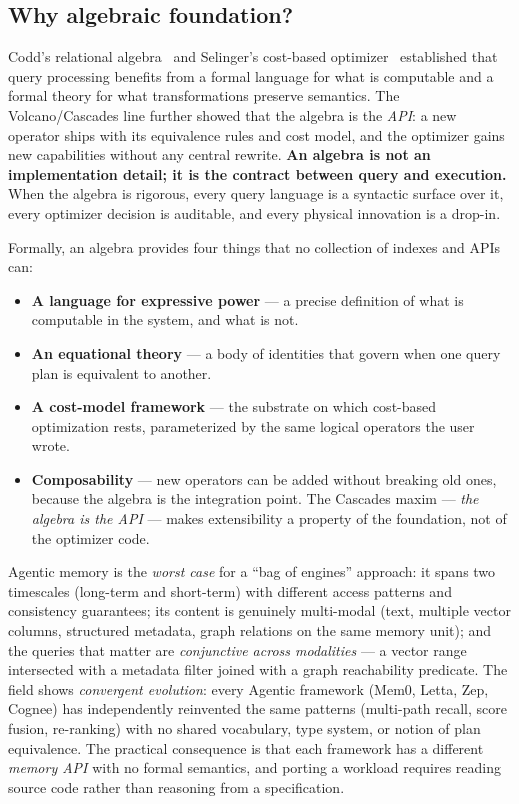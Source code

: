 \documentclass[acmsmall,review,anonymous]{acmart}
\theoremstyle{plain}
\theoremstyle{definition}
\theoremstyle{remark}
\begin{document}
\subsection{Why algebraic foundation?}\label{sec:intro:algebra}

Codd's relational algebra~\cite{codd1970} and Selinger's
cost-based optimizer~\cite{selinger1979} established that query
processing benefits from a formal language for what is computable
and a formal theory for what transformations preserve semantics.
The Volcano/Cascades line further showed that the algebra is the
\emph{API}: a new operator ships with its equivalence rules and cost
model, and the optimizer gains new capabilities without any central
rewrite. \textbf{An algebra is not an implementation detail; it is
the contract between query and execution.} When the algebra is
rigorous, every query language is a syntactic surface over it, every
optimizer decision is auditable, and every physical innovation is a
drop-in.

Formally, an algebra provides four things that no collection of
indexes and APIs can:

\begin{itemize}[leftmargin=*]
  \item \textbf{A language for expressive power} --- a precise
    definition of what is computable in the system, and what is not.
  \item \textbf{An equational theory} --- a body of identities that
    govern when one query plan is equivalent to another.
  \item \textbf{A cost-model framework} --- the substrate on which
    cost-based optimization rests, parameterized by the same logical
    operators the user wrote.
  \item \textbf{Composability} --- new operators can be added without
    breaking old ones, because the algebra is the integration point.
    The Cascades maxim --- \emph{the algebra is the API} --- makes
    extensibility a property of the foundation, not of the optimizer
    code.
\end{itemize}

Agentic memory is the \emph{worst case} for a ``bag of engines''
approach: it spans two timescales (long-term and short-term) with
different access patterns and consistency guarantees; its content
is genuinely multi-modal (text, multiple vector columns, structured
metadata, graph relations on the same memory unit); and the queries
that matter are \emph{conjunctive across modalities} --- a vector
range intersected with a metadata filter joined with a graph
reachability predicate. The field shows \emph{convergent evolution}:
every Agentic framework (Mem0, Letta, Zep, Cognee) has independently
reinvented the same patterns (multi-path recall, score fusion,
re-ranking) with no shared vocabulary, type system, or notion of plan
equivalence. The practical consequence is that each framework has a
different \emph{memory API} with no formal semantics, and porting a
workload requires reading source code rather than reasoning from a
specification.
\end{document}

